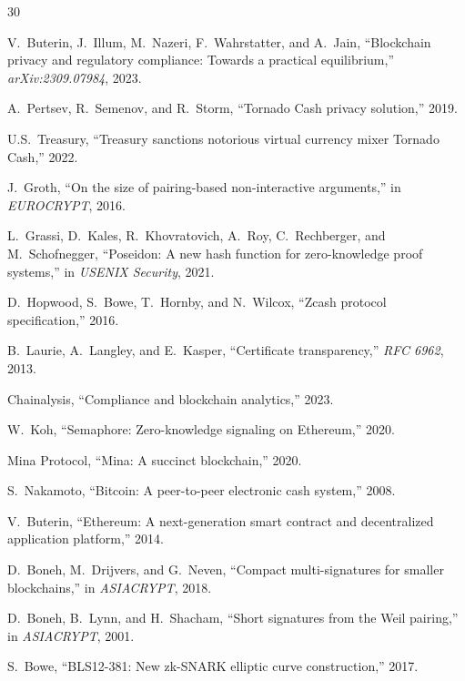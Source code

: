 
\begin{thebibliography}{30}

V.~Buterin, J.~Illum, M.~Nazeri, F.~Wahrstatter, and A.~Jain, ``Blockchain privacy and regulatory compliance: Towards a practical equilibrium,'' \emph{arXiv:2309.07984}, 2023.

A.~Pertsev, R.~Semenov, and R.~Storm, ``Tornado Cash privacy solution,'' 2019.

U.S.~Treasury, ``Treasury sanctions notorious virtual currency mixer Tornado Cash,'' 2022.

J.~Groth, ``On the size of pairing-based non-interactive arguments,'' in \emph{EUROCRYPT}, 2016.

L.~Grassi, D.~Kales, R.~Khovratovich, A.~Roy, C.~Rechberger, and M.~Schofnegger, ``Poseidon: A new hash function for zero-knowledge proof systems,'' in \emph{USENIX Security}, 2021.

D.~Hopwood, S.~Bowe, T.~Hornby, and N.~Wilcox, ``Zcash protocol specification,'' 2016.

B.~Laurie, A.~Langley, and E.~Kasper, ``Certificate transparency,'' \emph{RFC 6962}, 2013.

Chainalysis, ``Compliance and blockchain analytics,'' 2023.

W.~Koh, ``Semaphore: Zero-knowledge signaling on Ethereum,'' 2020.

Mina Protocol, ``Mina: A succinct blockchain,'' 2020.

S.~Nakamoto, ``Bitcoin: A peer-to-peer electronic cash system,'' 2008.

V.~Buterin, ``Ethereum: A next-generation smart contract and decentralized application platform,'' 2014.

D.~Boneh, M.~Drijvers, and G.~Neven, ``Compact multi-signatures for smaller blockchains,'' in \emph{ASIACRYPT}, 2018.

D.~Boneh, B.~Lynn, and H.~Shacham, ``Short signatures from the Weil pairing,'' in \emph{ASIACRYPT}, 2001.

S.~Bowe, ``BLS12-381: New zk-SNARK elliptic curve construction,'' 2017.


\end{thebibliography}
